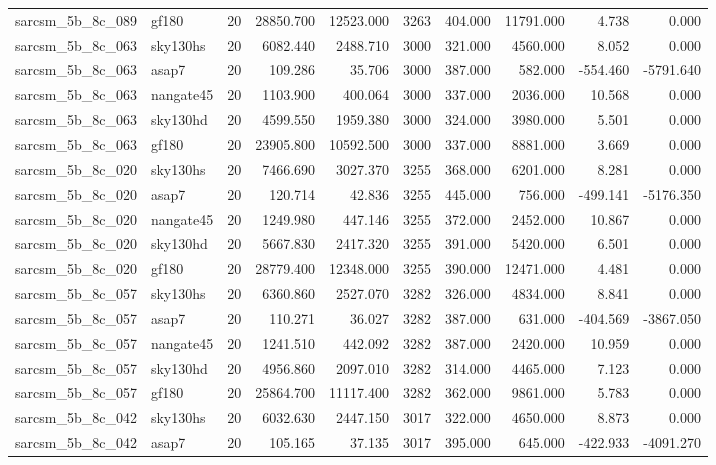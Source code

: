 \begin{tabular}{llrrrrrrrr}
sarcsm\_5b\_8c\_089 & gf180 & 20 & 28850.700 & 12523.000 & 3263 & 404.000 & 11791.000 & 4.738 & 0.000 \\
sarcsm\_5b\_8c\_063 & sky130hs & 20 & 6082.440 & 2488.710 & 3000 & 321.000 & 4560.000 & 8.052 & 0.000 \\
sarcsm\_5b\_8c\_063 & asap7 & 20 & 109.286 & 35.706 & 3000 & 387.000 & 582.000 & -554.460 & -5791.640 \\
sarcsm\_5b\_8c\_063 & nangate45 & 20 & 1103.900 & 400.064 & 3000 & 337.000 & 2036.000 & 10.568 & 0.000 \\
sarcsm\_5b\_8c\_063 & sky130hd & 20 & 4599.550 & 1959.380 & 3000 & 324.000 & 3980.000 & 5.501 & 0.000 \\
sarcsm\_5b\_8c\_063 & gf180 & 20 & 23905.800 & 10592.500 & 3000 & 337.000 & 8881.000 & 3.669 & 0.000 \\
sarcsm\_5b\_8c\_020 & sky130hs & 20 & 7466.690 & 3027.370 & 3255 & 368.000 & 6201.000 & 8.281 & 0.000 \\
sarcsm\_5b\_8c\_020 & asap7 & 20 & 120.714 & 42.836 & 3255 & 445.000 & 756.000 & -499.141 & -5176.350 \\
sarcsm\_5b\_8c\_020 & nangate45 & 20 & 1249.980 & 447.146 & 3255 & 372.000 & 2452.000 & 10.867 & 0.000 \\
sarcsm\_5b\_8c\_020 & sky130hd & 20 & 5667.830 & 2417.320 & 3255 & 391.000 & 5420.000 & 6.501 & 0.000 \\
sarcsm\_5b\_8c\_020 & gf180 & 20 & 28779.400 & 12348.000 & 3255 & 390.000 & 12471.000 & 4.481 & 0.000 \\
sarcsm\_5b\_8c\_057 & sky130hs & 20 & 6360.860 & 2527.070 & 3282 & 326.000 & 4834.000 & 8.841 & 0.000 \\
sarcsm\_5b\_8c\_057 & asap7 & 20 & 110.271 & 36.027 & 3282 & 387.000 & 631.000 & -404.569 & -3867.050 \\
sarcsm\_5b\_8c\_057 & nangate45 & 20 & 1241.510 & 442.092 & 3282 & 387.000 & 2420.000 & 10.959 & 0.000 \\
sarcsm\_5b\_8c\_057 & sky130hd & 20 & 4956.860 & 2097.010 & 3282 & 314.000 & 4465.000 & 7.123 & 0.000 \\
sarcsm\_5b\_8c\_057 & gf180 & 20 & 25864.700 & 11117.400 & 3282 & 362.000 & 9861.000 & 5.783 & 0.000 \\
sarcsm\_5b\_8c\_042 & sky130hs & 20 & 6032.630 & 2447.150 & 3017 & 322.000 & 4650.000 & 8.873 & 0.000 \\
sarcsm\_5b\_8c\_042 & asap7 & 20 & 105.165 & 37.135 & 3017 & 395.000 & 645.000 & -422.933 & -4091.270 \\

\end{tabular}
